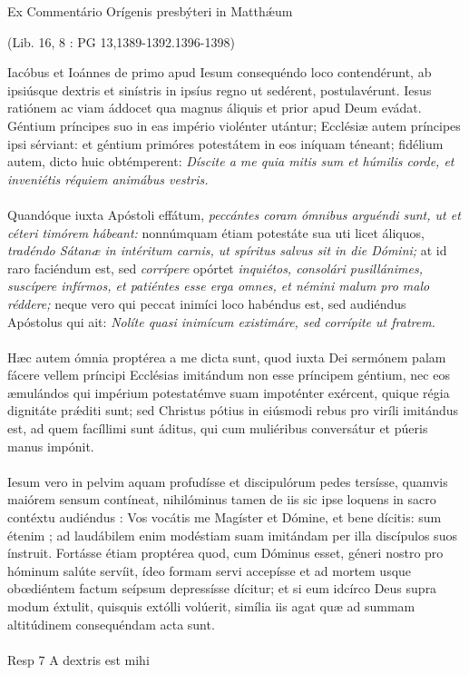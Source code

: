 \documentclass[options]{article}
\begin{document}
	Ex Commentário Orígenis presbýteri in Matth\'{æ}um
	\begin{flushright}
		(Lib. 16, 8 : PG 13,1389-1392.1396-1398)
	\end{flushright}
Iacóbus et Ioánnes de primo apud Iesum consequéndo loco contendérunt, ab ipsiúsque dextris et sinístris in ipsíus regno ut sedérent, postulavérunt. Iesus ratiónem ac viam áddocet qua magnus áliquis et prior apud Deum evádat. Géntium príncipes suo in eas império violénter utántur; Ecclésiæ autem príncipes ipsi sérviant: et géntium primóres potestátem in eos iníquam téneant; fidélium autem, dicto huic obtémperent:
\emph{Díscite a me quia mitis sum et húmilis corde, et inveniétis réquiem animábus vestris.}\\
\\
Quandóque iuxta Apóstoli effátum,
\emph{peccántes coram ómnibus arguéndi sunt, ut et céteri timórem hábeant:}
nonnúmquam étiam potestáte sua uti licet áliquos,
\emph{tradéndo Sátanæ in intéritum carnis, ut spíritus salvus sit in die Dómini;}
at id raro faciéndum est, sed
\emph{corrípere}
opórtet
\emph{inquiétos, consolári pusillánimes, suscípere infírmos, et patiéntes esse erga omnes, et némini malum pro malo réddere;}
neque vero qui peccat inimíci loco habéndus est, sed audiéndus Apóstolus qui ait: 
\emph{Nolíte quasi inimícum existimáre, sed corrípite ut fratrem.}\\
\\
Hæc autem ómnia proptérea a me dicta sunt, quod iuxta Dei sermónem palam fácere vellem príncipi Ecclésias imitándum non esse príncipem géntium, nec eos æmulándos qui impérium potestatémve suam impoténter exércent, quique régia dignitáte pr\'{æ}diti sunt; sed Christus pótius in eiúsmodi rebus pro viríli imitándus est, ad quem facíllimi sunt áditus, qui cum muliéribus conversátur et púeris manus impónit.\\
\\
Iesum vero in pelvim aquam profudísse et discipulórum pedes tersísse, quamvis maiórem sensum contíneat, nihilóminus tamen de iis sic ipse loquens in sacro contéxtu audiéndus : Vos vocátis me Magíster et Dómine, et bene dícitis: sum étenim ; ad laudábilem enim modéstiam suam imitándam per illa discípulos suos ínstruit. Fortásse étiam proptérea quod, cum Dóminus esset, géneri nostro pro hóminum salúte servíit, ídeo formam servi accepísse et ad mortem usque obœdiéntem factum seípsum depressísse dícitur; et si eum idcírco Deus supra modum éxtulit, quisquis extólli volúerit, simília iis agat quæ ad summam altitúdinem consequéndam acta sunt.\\
\\
Resp 7 A dextris est mihi

 
\end{document}
